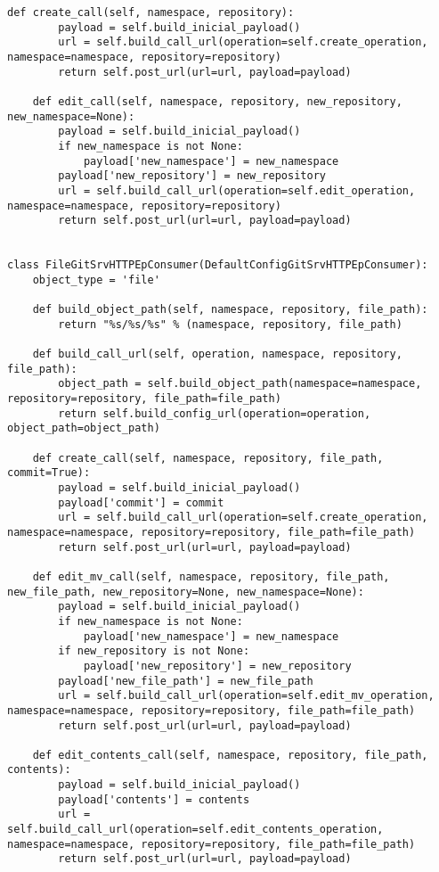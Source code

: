 \begin{lstlisting}[breaklines]
    def create_call(self, namespace, repository):
        payload = self.build_inicial_payload()
        url = self.build_call_url(operation=self.create_operation, namespace=namespace, repository=repository)
        return self.post_url(url=url, payload=payload)

    def edit_call(self, namespace, repository, new_repository, new_namespace=None):
        payload = self.build_inicial_payload()
        if new_namespace is not None:
            payload['new_namespace'] = new_namespace
        payload['new_repository'] = new_repository
        url = self.build_call_url(operation=self.edit_operation, namespace=namespace, repository=repository)
        return self.post_url(url=url, payload=payload)


class FileGitSrvHTTPEpConsumer(DefaultConfigGitSrvHTTPEpConsumer):
    object_type = 'file'

    def build_object_path(self, namespace, repository, file_path):
        return "%s/%s/%s" % (namespace, repository, file_path)

    def build_call_url(self, operation, namespace, repository, file_path):
        object_path = self.build_object_path(namespace=namespace, repository=repository, file_path=file_path)
        return self.build_config_url(operation=operation, object_path=object_path)

    def create_call(self, namespace, repository, file_path, commit=True):
        payload = self.build_inicial_payload()
        payload['commit'] = commit
        url = self.build_call_url(operation=self.create_operation, namespace=namespace, repository=repository, file_path=file_path)
        return self.post_url(url=url, payload=payload)

    def edit_mv_call(self, namespace, repository, file_path, new_file_path, new_repository=None, new_namespace=None):
        payload = self.build_inicial_payload()
        if new_namespace is not None:
            payload['new_namespace'] = new_namespace
        if new_repository is not None:
            payload['new_repository'] = new_repository
        payload['new_file_path'] = new_file_path
        url = self.build_call_url(operation=self.edit_mv_operation, namespace=namespace, repository=repository, file_path=file_path)
        return self.post_url(url=url, payload=payload)

    def edit_contents_call(self, namespace, repository, file_path, contents):
        payload = self.build_inicial_payload()
        payload['contents'] = contents
        url = self.build_call_url(operation=self.edit_contents_operation, namespace=namespace, repository=repository, file_path=file_path)
        return self.post_url(url=url, payload=payload)


\end{lstlisting}

